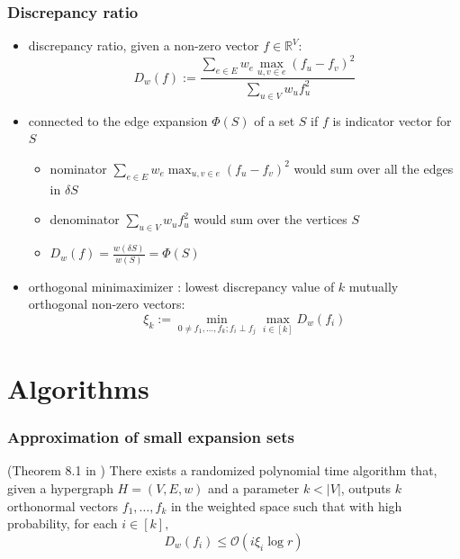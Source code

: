 \documentclass{beamer}
\begin{document}
	

	\begin{frame}
	\frametitle{Discrepancy ratio}
\begin{itemize}
			\item 
			 discrepancy ratio, given a non-zero vector $f \in \mathbb{R}^V$: \begin{equation}\label{eq:discrepancy_ratio}
			D_w(f) := \frac{\sum_{e\in E} w_e \max_{u,v\in e}(f_u - f_v)^2}{\sum_{u\in V} w_u f_u^2}
			\end{equation} 

			\item  connected to the edge expansion $\Phi(S)$ of a set $S$ if   $f$ is indicator vector for $S$
			\begin{itemize}
					\item  nominator $\sum_{e\in E} w_e \max_{u,v\in e}(f_u - f_v)^2$ would sum over all the edges in $\delta S$
				\item   denominator $\sum_{u\in V} w_u f_u^2$  would sum over the vertices $S$
				\item $	D_w(f) = \frac{w(\delta S)}{w(S)} = \Phi(S)$
			\end{itemize}
			
		
			
			
			
			\item  orthogonal minimaximizer :  lowest discrepancy value of $k$ mutually orthogonal non-zero vectors:
			\begin{equation}\label{eq:xi}
			\xi_k := \min_{0 \neq f_1, \ldots , f_k ; f_i \perp f_j } \max_{i \in [k]} D_w(f_i)
			\end{equation}

			
		
		\end{itemize}
			
		\end{frame}

	\section{Algorithms}



\begin{frame}
	\frametitle{Approximation of small expansion sets}

		\begin{theorem}{(Theorem 8.1 in \cite{ChanLTZ16}) \label{theorem:small_discrepancy_ratio}}
		There exists a randomized polynomial time algorithm that, given a hypergraph $H = (V,E,w)$ and a parameter $ k < |V |$, outputs $k$ orthonormal vectors $f_1, \ldots , f_k$ in the weighted space such that with high probability, for each $i  \in [k],$
		\begin{equation}
		D_w(f_i) \le \mathcal{O} (i \xi_i \log r  ) 
		\end{equation}	
	\end{theorem}
\end{frame}
\end{document}
